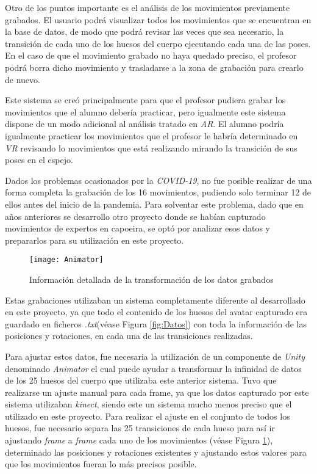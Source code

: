 Otro de los puntos importante es el análisis de los movimientos previamente grabados. El usuario podrá visualizar todos los movimientos que se encuentran en la base de datos, de modo que podrá revisar las veces que sea necesario, la transición de cada uno de los huesos del cuerpo ejecutando cada una de las poses. En el caso de que el movimiento grabado no haya quedado preciso, el profesor podrá borra dicho movimiento y trasladarse a la zona de grabación para crearlo de nuevo.

Este sistema se creó principalmente para que el profesor pudiera grabar los movimientos que el alumno debería practicar, pero igualmente este sistema dispone de un modo adicional al análisis tratado en \textit{AR}. El alumno podría igualmente practicar los movimientos que el profesor le habría determinado en \textit{VR} revisando lo movimientos que está realizando mirando la transición de sus poses en el espejo.

Dados los problemas ocasionados por la \textit{COVID-19}, no fue posible realizar de una forma completa la grabación de los 16 movimientos, pudiendo solo terminar 12 de ellos antes del inicio de la pandemia. Para solventar este problema, dado que en años anteriores se desarrollo otro proyecto donde se habían capturado movimientos de expertos en capoeira, se optó por analizar esos datos y prepararlos para su utilización en este proyecto.

\begin{figure}[h!]
    \centering 
    \texttt{[image: Animator]}
    \caption{Información detallada de la transformación de los datos grabados}
    \label{fig:Animator}
\end{figure} 

Estas grabaciones utilizaban un sistema completamente diferente al desarrollado en este proyecto, ya que todo el contenido de los huesos del avatar capturado era guardado en ficheros \textit{.txt}(véase Figura \ref{fig:Datos}) con toda la información de las posiciones y rotaciones, en cada una de las transiciones realizadas.

Para ajustar estos datos, fue necesaria la utilización de un componente de \textit{Unity} denominado \textit{Animator} el cual puede ayudar a transformar la infinidad de datos de los 25 huesos del cuerpo que utilizaba este anterior sistema. Tuvo que realizarse un ajuste manual para cada frame, ya que los datos capturado por este sistema utilizaban \textit{kinect}, siendo este un sistema mucho menos preciso que el utilizado en este proyecto. Para realizar el ajuste en el conjunto de todos los huesos, fue necesario separa las 25 transiciones de cada hueso para así ir ajustando \textit{frame} a \textit{frame} cada uno de los movimientos (véase Figura \ref{fig:Animator}), determinado las posiciones y rotaciones existentes y ajustando estos valores para que los movimientos fueran lo más precisos posible.


